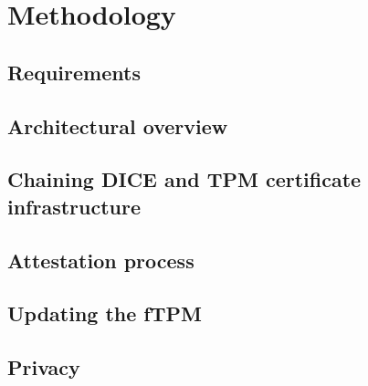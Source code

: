 
\chapter{Methodology}\label{chapter:methodology}

\section{Requirements}


\section{Architectural overview}


\section{Chaining DICE and TPM certificate infrastructure}

\section{Attestation process}

\section{Updating the fTPM}


\section{Privacy}
